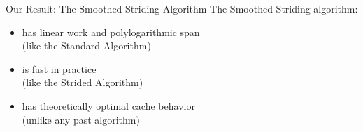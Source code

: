 \documentclass[xcolor=x11names, svgnames, rgb]{beamer}
\begin{document}
\begin{frame}[t]{Our Result: The Smoothed-Striding Algorithm}
	\vspace{0.5cm}
	The Smoothed-Striding algorithm:
	\begin{itemize}
		\item has linear work and polylogarithmic span \\
			{\color{blue} (like the Standard Algorithm)}
		\item is fast in practice \\
			{\color{blue} (like the Strided Algorithm)}
		\item 	has theoretically optimal cache behavior \\
			{\color{blue} (unlike any past algorithm)}
	\end{itemize}
\end{frame}

\end{document}
